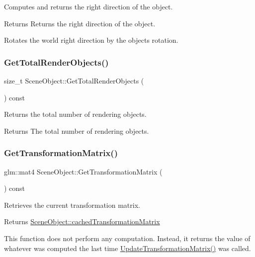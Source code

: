 Computes and returns the right direction of the object.

\begin{DoxyReturn}{Returns}
Returns the right direction of the object.
\end{DoxyReturn}
Rotates the world right direction by the object\textquotesingle{}s rotation. \hypertarget{class_scene_object_a34f3e11a64d5879def4105b50d853ad1}{}\label{class_scene_object_a34f3e11a64d5879def4105b50d853ad1}
\subsubsection{\texorpdfstring{Get\+Total\+Render\+Objects()}{GetTotalRenderObjects()}}
{\footnotesize\ttfamily size\+\_\+t Scene\+Object\+::\+Get\+Total\+Render\+Objects (\begin{DoxyParamCaption}{ }\end{DoxyParamCaption}) const\hspace{0.3cm}{\ttfamily [inline]}}



Returns the total number of rendering objects.

\begin{DoxyReturn}{Returns}
The total number of rendering objects.
\end{DoxyReturn}
\hypertarget{class_scene_object_afbb67229fa9895d9e4a9322e64ea4a66}{}\label{class_scene_object_afbb67229fa9895d9e4a9322e64ea4a66}
\subsubsection{\texorpdfstring{Get\+Transformation\+Matrix()}{GetTransformationMatrix()}}
{\footnotesize\ttfamily glm\+::mat4 Scene\+Object\+::\+Get\+Transformation\+Matrix (\begin{DoxyParamCaption}{ }\end{DoxyParamCaption}) const\hspace{0.3cm}{\ttfamily [virtual]}}



Retrieves the current transformation matrix.

\begin{DoxyReturn}{Returns}
\hyperlink{class_scene_object_aac3f13eea8a7b455e8cffc6eceef211c}{Scene\+Object\+::cached\+Transformation\+Matrix}
\end{DoxyReturn}
This function does not perform any computation. Instead, it returns the value of whatever was computed the last time \hyperlink{class_scene_object_a20e31da3f9d2765de50cdb2d637ae6c9}{Update\+Transformation\+Matrix()} was called. \hypertarget{class_scene_object_a88091d7fdb126137d4018738cd30f3d8}{}\label{class_scene_object_a88091d7fdb126137d4018738cd30f3d8}

